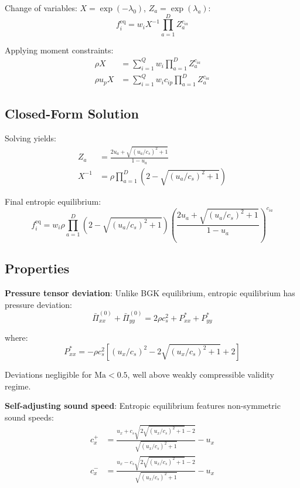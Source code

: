 Change of variables: $X = \exp(-\lambda_0)$, $Z_a = \exp(\lambda_a)$:
\begin{equation}
f_i^{\mathrm{eq}} = w_i X^{-1} \prod_{a=1}^{D} Z_a^{c_{ia}}
\end{equation}

Applying moment constraints:
\begin{align}
\rho X &= \sum_{i=1}^{Q} w_i \prod_{a=1}^{D} Z_a^{c_{ia}} \\
\rho u_p X &= \sum_{i=1}^{Q} w_i c_{ip} \prod_{a=1}^{D} Z_a^{c_{ia}}
\end{align}

\subsection{Closed-Form Solution}

Solving yields:
\begin{align}
Z_a &= \frac{2u_a + \sqrt{(u_a/c_s)^2 + 1}}{1 - u_a} \\
X^{-1} &= \rho \prod_{a=1}^{D}\left(2 - \sqrt{(u_a/c_s)^2 + 1}\right)
\end{align}

Final entropic equilibrium:
\begin{equation}
f_i^{\mathrm{eq}} = w_i \rho \prod_{a=1}^{D} \left(2 - \sqrt{(u_a/c_s)^2 + 1}\right) \left(\frac{2u_a + \sqrt{(u_a/c_s)^2 + 1}}{1 - u_a}\right)^{c_{ia}}
\end{equation}

\subsection{Properties}

\textbf{Pressure tensor deviation}: Unlike BGK equilibrium, entropic equilibrium has pressure deviation:
\begin{equation}
\bar{\Pi}_{xx}^{(0)} + \bar{\Pi}_{yy}^{(0)} = 2\rho c_s^2 + P_{xx}^* + P_{yy}^*
\end{equation}

where:
\begin{equation}
P_{xx}^* = -\rho c_s^2\left[(u_x/c_s)^2 - 2\sqrt{(u_x/c_s)^2 + 1} + 2\right]
\end{equation}

Deviations negligible for $\mathrm{Ma} < 0.5$, well above weakly compressible validity regime.

\textbf{Self-adjusting sound speed}: Entropic equilibrium features non-symmetric sound speeds:
\begin{align}
c_x^{+} &= \frac{u_x + c_s\sqrt{2\sqrt{(u_x/c_s)^2 + 1} - 2}}{\sqrt{(u_x/c_s)^2 + 1}} - u_x \\
c_x^{-} &= \frac{u_x - c_s\sqrt{2\sqrt{(u_x/c_s)^2 + 1} - 2}}{\sqrt{(u_x/c_s)^2 + 1}} - u_x
\end{align}


